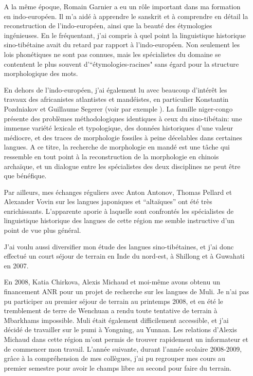 \documentclass[oldfontcommands,oneside,a4paper,11pt]{memoir}
\begin{document}
A la même époque,   Romain Garnier  a eu un rôle important dans ma formation   en indo-européen. Il m'a aidé à apprendre le sanskrit et à comprendre en détail la reconstruction de l'indo-européen, ainsi que la beauté des étymologies ingénieuses. En le fréquentant, j'ai compris à quel point la linguistique historique sino-tibétaine avait du retard par rapport à l'indo-européen. Non seulement les lois phonétiques ne sont pas connues, mais les spécialistes du domaine se contentent le plus souvent  d'``étymologies-racines" sans égard pour la structure morphologique des mots. 

En dehors de l'indo-européen, j'ai également lu avec beaucoup d'intérêt les travaux   des africanistes atlantistes et mandéistes, en particulier Konstantin Pozdniakov et Guillaume Segerer (voir par exemple \citealt{pozdniakov93atlantique}). La famille niger-congo présente des problèmes méthodologiques identiques à ceux du sino-tibétain: une immense variété lexicale et typologique, des données historiques d'une valeur médiocre, et des traces de morphologie fossiles à peine décelables dans certaines langues. A ce titre, la recherche de morphologie en mandé est une tâche qui ressemble en tout point à la reconstruction de la morphologie en chinois archaïque, et un dialogue entre les spécialistes des deux disciplines ne peut être que bénéfique.


Par ailleurs, mes échanges réguliers avec Anton Antonov, Thomas Pellard et Alexander Vovin sur les langues japoniques et ``altaïques'' ont été très enrichissants. L'apparente aporie à laquelle sont confrontés les spécialistes de linguistique historique des langues de cette région me semble instructive d'un point de vue plus général. 



J'ai voulu aussi diversifier mon étude des langues sino-tibétaines, et j'ai donc effectué un court séjour de terrain en Inde du nord-est, à Shillong et à Guwahati en 2007.

En 2008,   Katia Chirkova, Alexis Michaud et moi-même avons   obtenu un financement ANR pour un  projet de recherche sur les langues de Muli. Je n'ai pas pu participer au premier séjour de terrain au printemps 2008, et en été le tremblement de terre de Wenchuan a rendu toute tentative de terrain à Mbarkhams impossible. Muli était également difficilement accessible, et j'ai décidé de travailler sur le pumi à Yongning, au Yunnan. Les relations d'Alexis Michaud dans cette région m'ont permis de trouver rapidement un informateur et de commencer mon travail. L'année suivante, durant l'année scolaire 2008-2009, grâce à la compréhension de mes collègues, j'ai pu regrouper mes cours  au premier semestre pour avoir le champs libre au second pour faire du terrain. 
\end{document}
